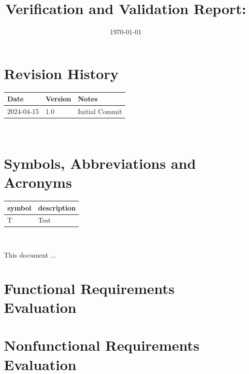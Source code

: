 \documentclass[12pt, titlepage]{article}
\begin{document}
\title{Verification and Validation Report: \progname} 
\author{\authname}
\date{\today}
	
\maketitle


\section{Revision History}

\begin{tabularx}{\textwidth}{p{3cm}p{2cm}X}
\toprule {\bf Date} & {\bf Version} & {\bf Notes}\\
\midrule
2024-04-15 & 1.0 & Initial Commit\\
\bottomrule
\end{tabularx}

~\newpage

\section{Symbols, Abbreviations and Acronyms}

\renewcommand{\arraystretch}{1.2}
\begin{tabular}{l l} 
  \toprule		
  \textbf{symbol} & \textbf{description}\\
  \midrule 
  T & Test\\
  \bottomrule
\end{tabular}\\


\newpage

\tableofcontents

\listoftables %

\listoffigures %

\newpage


This document ...

\section{Functional Requirements Evaluation}

\section{Nonfunctional Requirements Evaluation}
\end{document}
